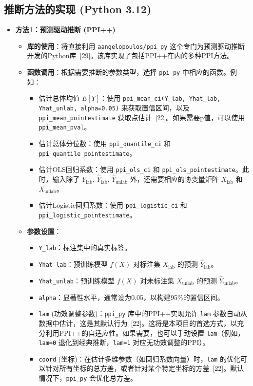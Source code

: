 \documentclass[12pt,a4paper]{article}
\begin{document}
\subsection{推断方法的实现 (Python 3.12)}
\label{sec:inference_implementation}
\begin{itemize}
    \item \textbf{方法1：预测驱动推断 (PPI++)}
    \begin{itemize}
        \item \textbf{库的使用}：将直接利用 \texttt{aangelopoulos/ppi\_py} 这个专门为预测驱动推断开发的Python库~{[29]}。该库实现了包括PPI++在内的多种PPI方法。
        \item \textbf{函数调用}：根据需要推断的参数类型，选择 \texttt{ppi\_py} 中相应的函数。例如：
        \begin{itemize}
            \item 估计总体均值 $E[Y]$：使用 \texttt{ppi\_mean\_ci(Y\_lab, Yhat\_lab, Yhat\_unlab, alpha=0.05)} 来获取置信区间，以及 \texttt{ppi\_mean\_pointestimate} 获取点估计~{[22]}。如果需要p值，可以使用 \texttt{ppi\_mean\_pval}。
            \item 估计总体分位数：使用 \texttt{ppi\_quantile\_ci} 和 \texttt{ppi\_quantile\_pointestimate}。
            \item 估计OLS回归系数：使用 \texttt{ppi\_ols\_ci} 和 \texttt{ppi\_ols\_pointestimate}。此时，输入除了 $Y_{\text{lab}}$, $\hat{Y}_{\text{lab}}$, $\hat{Y}_{\text{unlab}}$ 外，还需要相应的协变量矩阵 $X_{\text{lab}}$ 和 $X_{\text{unlab}}$。
            \item 估计Logistic回归系数：使用 \texttt{ppi\_logistic\_ci} 和 \texttt{ppi\_logistic\_pointestimate}。
        \end{itemize}
        \item \textbf{参数设置}：
        \begin{itemize}
            \item \texttt{Y\_lab}：标注集中的真实标签。
            \item \texttt{Yhat\_lab}：预训练模型 $f(X)$ 对标注集 $X_{\text{lab}}$ 的预测 $\hat{Y}_{\text{lab}}$。
            \item \texttt{Yhat\_unlab}：预训练模型 $f(X)$ 对未标注集 $X_{\text{unlab}}$ 的预测 $\hat{Y}_{\text{unlab}}$。
            \item \texttt{alpha}：显著性水平，通常设为0.05，以构建95\%的置信区间。
            \item \texttt{lam} (功效调整参数)：\texttt{ppi\_py} 库中的PPI++实现允许 \texttt{lam} 参数自动从数据中估计，这是其默认行为~{[22]}。这将是本项目的首选方式，以充分利用PPI++的自适应性。如果需要，也可以手动设置 \texttt{lam}（例如，\texttt{lam=0} 退化到经典推断，\texttt{lam=1} 对应无功效调整的PPI）。
            \item \texttt{coord} (坐标)：在估计多维参数（如回归系数向量）时，\texttt{lam} 的优化可以针对所有坐标的总方差，或者针对某个特定坐标的方差~{[22]}。默认情况下，\texttt{ppi\_py} 会优化总方差。
        \end{itemize}
    \end{itemize}


\end{itemize}
\end{document}
